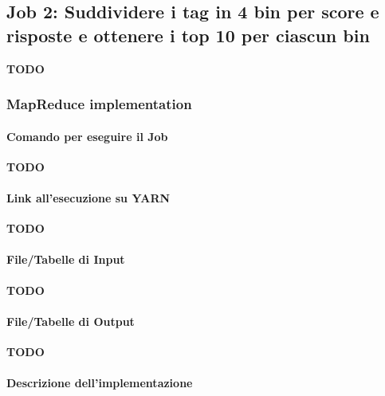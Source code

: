 

\subsection[%
    Job 2: Suddividere tag in base a score e risposte%
  ]{%
    Job 2: Suddividere i tag in 4 bin per score e risposte e ottenere i top 10 per ciascun bin%
  }\label{subsec:job2}

  \textbf{TODO}

  \subsubsection{MapReduce implementation}\label{subsub:job2:mapreduce}

  \paragraph{Comando per eseguire il Job}\label{par:job2:mapreduce:cmd}

  \textbf{TODO}

  \paragraph{Link all'esecuzione su YARN}\label{par:job2:mapreduce:yarn}

  \textbf{TODO}

  \paragraph{File/Tabelle di Input}\label{par:job2:mapreduce:input}

  \textbf{TODO}

  \paragraph{File/Tabelle di Output}\label{par:job2:mapreduce:output}

  \textbf{TODO}

  \paragraph{Descrizione dell'implementazione}\label{par:job2:mapreduce:implementation}

